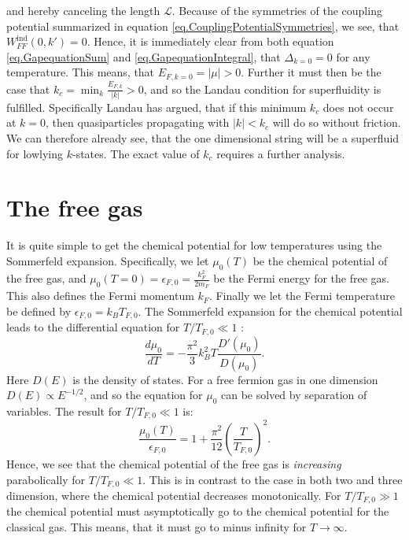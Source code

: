 and hereby canceling the length $\mathcal{L}$. Because of the symmetries of the coupling potential summarized in equation \eqref{eq.CouplingPotentialSymmetries}, we see, that $W^\text{ind}_{FF}(0,k') = 0$. Hence, it is immediately clear from both equation \eqref{eq.GapequationSum} and \eqref{eq.GapequationIntegral}, that $\Delta_{k=0} = 0$ for any temperature. This means, that $E_{F,k=0} = |\mu| > 0$. Further it must then be the case that $k_c = \min_k \frac{E_{F,k}}{|k|} > 0$, and so the Landau condition for superfluidity is fulfilled\cite{LandauStatPhys2,PlischkeStatPhys}.
Specifically Landau has argued, that if this minimum $k_c$ does not occur at $k=0$, then quasiparticles propagating with $|k|< k_c$ will do so without friction. We can therefore already see, that the one dimensional string will be a superfluid for lowlying $k$-states. The exact value of $k_c$ requires a further analysis. 

\section{The free gas} \label{sec.chemicalpotential.freegas}
It is quite simple to get the chemical potential for low temperatures using the Sommerfeld expansion. Specifically, we let $\mu_0(T)$ be the chemical potential of the free gas, and $\mu_0(T=0) = \epsilon_{F,0} = \frac{k_F^2}{2m_F}$ be the Fermi energy for the free gas. This also defines the Fermi momentum $k_F$. Finally we let the Fermi temperature be defined by $\epsilon_{F,0} = k_B T_{F,0}$. The Sommerfeld expansion for the chemical potential leads to the differential equation for $T/T_{F,0} \ll 1$ \cite{GiuseppeGiuseppe}:
\begin{equation}
\frac{d\mu_0}{dT} = -\frac{\pi^2}{3}k_B^2 T \frac{D'(\mu_0)}{D(\mu_0)}. \nonumber
\end{equation}
Here $D(E)$ is the density of states. For a free fermion gas in one dimension $D(E)\propto E^{-1/2}$, and so the equation for $\mu_0$ can be solved by separation of variables. The result for $T/T_{F,0}\ll 1$ is:
\begin{equation}
\frac{\mu_0(T)}{\epsilon_{F,0}} = 1 + \frac{\pi^2}{12}\left(\frac{T}{T_{F,0}}\right)^2.
\end{equation}
Hence, we see that the chemical potential of the free gas is \textit{increasing} parabolically for $T/T_{F,0} \ll 1$. This is in contrast to the case in both two and three dimension, where the chemical potential decreases monotonically. For $T/T_{F,0} \gg 1$ the chemical potential must asymptotically go to the chemical potential for the classical gas. This means, that it must go to minus infinity for $T\to \infty$.

